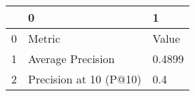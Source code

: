 \begin{tabular}{lll}
\toprule
{} &                       0 &       1 \\
\midrule
0 &                  Metric &   Value \\
1 &       Average Precision &  0.4899 \\
2 &  Precision at 10 (P@10) &     0.4 \\
\bottomrule
\end{tabular}
